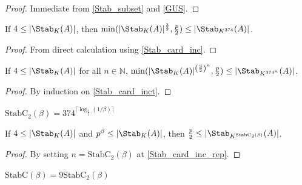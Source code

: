 \begin{proof}
    \leanok
    Immediate from \ref{Stab_subset} and \ref{GUS}.
\end{proof}

\begin{lemma}
    \label{Stab_card_inct}
    \leanok
    If $4 \leq |\Stab_K(A)|$, then $\min(|\Stab_K(A)|^{\frac32}, \frac p2) \leq |\Stab_{K^{374}}(A)|$.
\end{lemma}

\begin{proof}
    \leanok
    From direct calculation using \ref{Stab_card_inc}.
\end{proof}

\begin{lemma}
    \label{Stab_card_inc_rep}
    \leanok
    If $4 \leq |\Stab_K(A)|$ for all $n \in \mathbb{N}$,
    $\min(|\Stab_K(A)|^{\left(\frac32\right)^n}, \frac p2) \leq |\Stab_{K^{374^n}}(A)|$.
\end{lemma}

\begin{proof}
    \leanok
    By induction on \ref{Stab_card_inct}.
\end{proof}

\begin{definition}
    \label{StabC_2}
    \leanok
    $\mathrm{StabC}_2(\beta) = 374^{\lceil \log_{\frac32}(1 / \beta) \rceil}$
\end{definition}

\begin{lemma}
    \label{Stab_fullt}
    \leanok
    If $4 \leq |\Stab_K(A)|$ and $p^\beta \leq |\Stab_K(A)|$,
    then $\frac{p}2 \leq |\Stab_{K^{\mathrm{StabC}_2(\beta)}}(A)|$.
\end{lemma}

\begin{proof}
    \leanok
    By setting $n = \mathrm{StabC}_2(\beta)$ at \ref{Stab_card_inc_rep}.
\end{proof}

\begin{definition}
    \label{StabC}
    \leanok
    $\mathrm{StabC}(\beta) = 9 \mathrm{StabC}_2(\beta)$
\end{definition}


